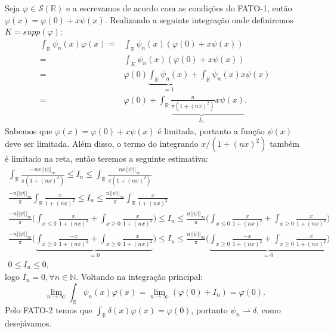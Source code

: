 \documentclass{article}
\begin{document}
\begin{enumerate}
\begin{enumerate}
				
				
				Seja $\varphi \in \mathcal{S}(\mathbb{R})$ e a escrevamos de acordo com as condições do FATO-1, então $\varphi(x) = \varphi(0) + x\psi(x)$. Realizando a seguinte integração onde definiremos $K = supp(\varphi)$:
				$$
				\begin{aligned}
				\int_{\mathbb{R}} \psi_{n}(x)\varphi(x) = &\int_{\mathbb{R}} \psi_{n}(x)(\varphi(0) + x\psi(x)) 
				\\
				= &\int_{K} \psi_{n}(x)(\varphi(0) + x\psi(x)) 
				\\
				= & \varphi(0) \underbrace{ \int_{\mathbb{R}} \psi_{n}(x) } _{=1}  +  \int_{\mathbb{R}} \psi_{n}(x) x\psi(x) 
				\\
				= & \varphi(0)  +  \underbrace{ \int_{\mathbb{R}} \frac{n}{\pi(1+(nx)^{2})}  x\psi(x) }_{I_{n}} .
				\end{aligned}
				$$
				Sabemos que $\varphi(x) = \varphi(0) + x\psi(x)$ é limitada, portanto a função $\psi(x)$ deve ser limitada. Além disso, o termo do integrando $x/(1+(nx)^{2})$ também é limitado na reta, então teremos a seguinte estimativa:
				$$
				\begin{gathered}
				\int_{\mathbb{R}}  \frac{-n x ||\psi||_{\infty}}{\pi(1+(nx)^{2})} \leq  I_{n}	\leq \int_{\mathbb{R}} \frac{n x ||\psi||_{\infty}}{\pi(1+(nx)^{2})} 
				\\
				\frac{-n||\psi||_{\infty}}{\pi}\int_{\mathbb{R}}  \frac{x}{1+(nx)^{2}} \leq  I_{n}	\leq  \frac{n||\psi||_{\infty}}{\pi} \int_{\mathbb{R}} \frac{x}{1+(nx)^{2}} 
				\\
				\frac{-n||\psi||_{\infty}}{\pi} \Big( \int_{x \leq 0} \frac{x}{1+(nx)^{2}} + \int_{x \geq 0} \frac{x}{1+(nx)^{2}} \Big) \leq  I_{n}	\leq  \frac{n||\psi||_{\infty}}{\pi} \Big( \int_{x \leq 0} \frac{x}{1+(nx)^{2}} + \int_{x \geq 0} \frac{x}{1+(nx)^{2}} \Big) 
				\\
				\frac{-n||\psi||_{\infty}}{\pi} \Big( \underbrace{ \int_{x \geq 0} \frac{-x}{1+(nx)^{2}} + \int_{x \geq 0} \frac{x}{1+(nx)^{2}} }_{=0} \Big) \leq  I_{n}	\leq  \frac{n||\psi||_{\infty}}{\pi} \Big( \underbrace{ \int_{x \geq 0} \frac{-x}{1+(nx)^{2}} + \int_{x \geq 0} \frac{x}{1+(nx)^{2}} }_{=0} \Big)
				\\
				0 \leq  I_{n}	\leq 0,
				\end{gathered} 
				$$
				logo $I_{n} = 0, \forall n \in \mathbb{N}$. Voltando na integração principal:
				$$
				\lim_{n \to \infty} \int_{\mathbb{R}} \psi_{n}(x)\varphi(x) = \lim_{n \to \infty} (\varphi(0) + I_{n}) = \varphi(0).
				$$
				Pelo FATO-2 temos que $\int_{\mathbb{R}} \delta(x) \varphi(x) = \varphi(0)$, portanto $\psi_{n} \rightharpoonup \delta$, como desejávamos.
			\end{enumerate}
	\end{enumerate}
	
	
\end{document}
